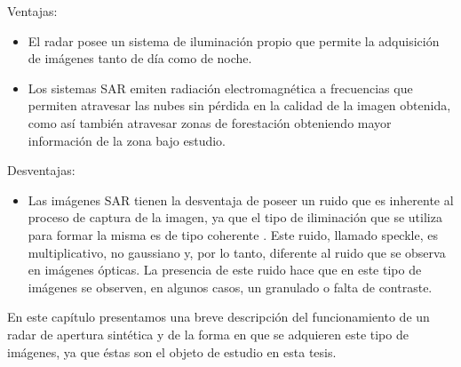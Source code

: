 Ventajas:
\begin{itemize}
	\item El radar posee un sistema de iluminación propio que permite la adquisición de imágenes tanto de día como de noche.
	\item Los sistemas SAR emiten radiación electromagnética a frecuencias que permiten atravesar las nubes sin pérdida en la calidad de la imagen obtenida, como así también atravesar zonas de forestación obteniendo mayor información de la zona bajo estudio.
\end{itemize}

Desventajas: 
\begin{itemize}
	\item Las imágenes SAR tienen la desventaja de poseer un ruido que es inherente al proceso de captura de la imagen, ya que el tipo de iliminación que se utiliza para formar la misma es de tipo coherente \cite{goodman85}. Este ruido, llamado speckle, es multiplicativo, no gaussiano y, por lo tanto, diferente al ruido que se observa en imágenes ópticas. La presencia de este ruido hace que en este tipo de imágenes se observen, en algunos casos, un granulado o falta de contraste.
\end{itemize}

En este capítulo presentamos una breve descripción del funcionamiento de un radar de apertura sintética y de la forma en que se adquieren este tipo de imágenes, ya que éstas son el objeto de estudio en esta tesis.



